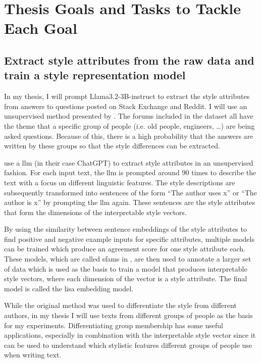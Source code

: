 
\section{Thesis Goals and Tasks to Tackle Each Goal}
\subsection{Extract style attributes from the raw data and train a style representation model}
In my thesis, I will prompt Llama3.2-3B-instruct %
to extract the style attributes from answers to questions posted on Stack Exchange and Reddit. I will use an unsupervised method presented by \citet{patelLearningInterpretableStyle2023}. The forums included in the dataset all have the theme that a specific group of people (i.e. old people, engineers, \ldots) are being asked questions. Because of this, there is a high probability that the answers are written by these groups so that the style differences can be extracted.

\citeauthor{patelLearningInterpretableStyle2023} use a \acl{llm} (in their case ChatGPT) to extract style attributes in an unsupervised fashion. For each input text, the \ac{llm} is prompted around 90 times to describe the text with a focus on different linguistic features. The style descriptions are subsequently transformed into sentences of the form \enquote{The author uses x} or \enquote{The author is x} by prompting the \ac{llm} again. These sentences are the style attributes that form the dimensions of the interpretable style vectors.

By using the similarity between sentence embeddings of the style attributes to find positive and negative example inputs for specific attributes, multiple models can be trained which produce an agreement score for one style attribute each. These models, which are called \acp{sfam} in \citet{patelLearningInterpretableStyle2023}, are then used to annotate a larger set of data which is used as the basis to train a model that produces interpretable style vectors, where each dimension of the vector is a style attribute. The final model is called the \ac{lisa} embedding model.

While the original method was used to differentiate the style from different authors, in my thesis I will use texts from different groups of people as the basis for my experiments. Differentiating group membership has some useful applications, especially in combination with the interpretable style vector since it can be used to understand which stylistic features different groups of people use when writing text. %

